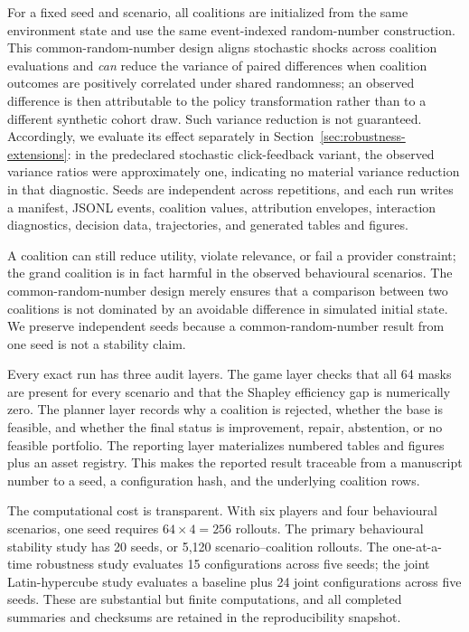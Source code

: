 \documentclass[review]{elsarticle}
\theoremstyle{plain}
\theoremstyle{definition}
\theoremstyle{remark}
\begin{document}
For a fixed seed and scenario, all coalitions are initialized from the same environment state and use the same event-indexed random-number construction. This common-random-number design aligns stochastic shocks across coalition evaluations and \emph{can} reduce the variance of paired differences when coalition outcomes are positively correlated under shared randomness; an observed difference is then attributable to the policy transformation rather than to a different synthetic cohort draw. Such variance reduction is not guaranteed. Accordingly, we evaluate its effect separately in Section~\ref{sec:robustness-extensions}: in the predeclared stochastic click-feedback variant, the observed variance ratios were approximately one, indicating no material variance reduction in that diagnostic. Seeds are independent across repetitions, and each run writes a manifest, JSONL events, coalition values, attribution envelopes, interaction diagnostics, decision data, trajectories, and generated tables and figures.

A coalition can still reduce utility, violate relevance, or fail a provider constraint; the grand coalition is in fact harmful in the observed behavioural scenarios. The common-random-number design merely ensures that a comparison between two coalitions is not dominated by an avoidable difference in simulated initial state. We preserve independent seeds because a common-random-number result from one seed is not a stability claim.

Every exact run has three audit layers. The game layer checks that all 64 masks are present for every scenario and that the Shapley efficiency gap is numerically zero. The planner layer records why a coalition is rejected, whether the base is feasible, and whether the final status is improvement, repair, abstention, or no feasible portfolio. The reporting layer materializes numbered tables and figures plus an asset registry. This makes the reported result traceable from a manuscript number to a seed, a configuration hash, and the underlying coalition rows.

The computational cost is transparent. With six players and four behavioural scenarios, one seed requires $64\times4=256$ rollouts. The primary behavioural stability study has 20 seeds, or 5,120 scenario--coalition rollouts. The one-at-a-time robustness study evaluates 15 configurations across five seeds; the joint Latin-hypercube study evaluates a baseline plus 24 joint configurations across five seeds. These are substantial but finite computations, and all completed summaries and checksums are retained in the reproducibility snapshot.
\end{document}
